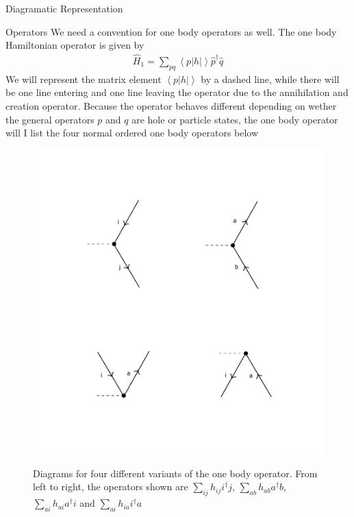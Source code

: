 \documentclass[twoside,english]{uiofysmaster}
\begin{document}
\begin{chapter}{Diagramatic Representation}
	\begin{section}{Operators}
		We need a convention for one body operators as well. The one body Hamiltonian operator is given by 
		\begin{align}
			\hat H_1 = \sum_{pq} \left< p | h | \right> \hat p^\dagger \hat q
		\end{align}
		We will represent the matrix element $\left< p | h | \right>$ by a dashed line, while there will be one line entering and one line leaving the operator due to the annihilation and creation operator. Because the operator behaves different depending on wether the general operators $p$ and $q$ are hole or particle states, the one body operator will I list the four normal ordered one body operators below \cite{ShavittAndBartlett}
		\begin{figure}[H]
			\includegraphics[width=\textwidth]{Figures/OneBodyOperator.pdf}
			\label{OneBodyOperator}
			\caption{Diagrams for four different variants of the one body operator. From left to right, the operators shown are $\sum_{ij} h_{ij} i^\dagger j $, $\sum_{ab} h_{ab} a^\dagger b$, $\sum_{ai}h_{ai} a^\dagger i$ and $\sum_{ai} h_{ia} i^\dagger a$}
		\end{figure}


\end{section}
\end{chapter}
\end{document}
